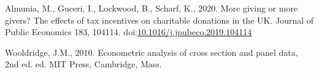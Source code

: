 \documentclass[
  11pt,
  a4paper,
]{article}
\newlength{\cslhangindent}
\newlength{\cslentryspacingunit} %
\newenvironment{CSLReferences}[2] %
 {%
  \setlength{\parindent}{0pt}
  \ifodd #1
  \let\oldpar\par
  \def\par{\hangindent=\cslhangindent\oldpar}
  \fi
  \setlength{\parskip}{#2\cslentryspacingunit}
 }%
 {}
\begin{document}
\hypertarget{refs}{}
\begin{CSLReferences}{1}{0}
\leavevmode{}%
Almunia, M., Guceri, I., Lockwood, B., Scharf, K., 2020. More giving or more givers? {The} effects of tax incentives on charitable donations in the {UK}. Journal of Public Economics 183, 104114. doi:\href{https://doi.org/10.1016/j.jpubeco.2019.104114}{10.1016/j.jpubeco.2019.104114}

\leavevmode{}%
Wooldridge, J.M., 2010. Econometric analysis of cross section and panel data, 2nd ed. ed. {MIT Press}, {Cambridge, Mass}.

\end{CSLReferences}
\end{document}
